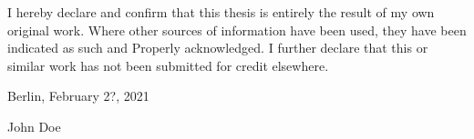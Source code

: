 
I hereby declare and confirm that this thesis is entirely the result of my own original work. Where other sources of information have been used, they have been indicated as such and Properly acknowledged. I further declare that this or similar work has not been submitted for credit elsewhere.

\vskip 1cm

Berlin, February 2?, 2021

\vskip 1.5cm

John Doe